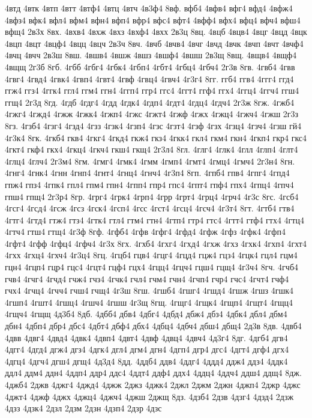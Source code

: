 {4втд
4втк
4втп
4втт
4втф4
4втц
4втч
4в3ф4
8вф.
вфб4
4вфв4
вфг4
вфд4
4вфж4
4вфз4
вфк4
вфл4
вфм4
вфн4
вфп4
вфр4
вфс4
вфт4
4вфф4
вфх4
вфц4
вфч4
вфш4
вфщ4
2в3х
8вх.
4вхв4
4вхж
4вхз
4вхф4
4вхх
2в3ц
8вц.
4вцб
4вцв4
4вцг
4вцд
4вцк
4вцп
4вцт
4вцф4
4вцц
4вцч
2в3ч
8вч.
4вчб
4вчв4
4вчг
4вчд
4вчк
4вчп
4вчт
4вчф4
4вчц
4вчч
2в3ш
8вш.
4вшв4
4вшж
4вшз
4вшф4
4вшш
2в3щ
8вщ.
4вщв4
4вщф4
4вщщ
2г3б
8гб.
4гбб
4гбг4
4гбк4
4гбп4
4гбт4
4гбц4
4гбч4
2г3в
8гв.
4гвб4
4гвв
4гвг4
4гвд4
4гвк4
4гвп4
4гвт4
4гвф
4гвц4
4гвч4
4г3г4
8гг.
ггб4
ггв4
4ггг4
ггд4
ггж4
ггз4
4ггк4
ггл4
ггм4
ггн4
4ггп4
ггр4
ггс4
4ггт4
ггф4
ггх4
4ггц4
4ггч4
ггш4
ггщ4
2г3д
8гд.
4гдб
4гдг4
4гдд
4гдк4
4гдп4
4гдт4
4гдц4
4гдч4
2г3ж
8гж.
4гжб4
4гжг4
4гжд4
4гжж
4гжк4
4гжп4
4гжс
4гжт4
4гжф
4гжх
4гжц4
4гжч4
4гжш
2г3з
8гз.
4гзб4
4гзг4
4гзд4
4гзз
4гзк4
4гзп4
4гзс
4гзт4
4гзф
4гзх
4гзц4
4гзч4
4гзш
гй4
4г3к4
8гк.
4гкб4
гкв4
4гкг4
4гкд4
гкж4
гкз4
4гкк4
гкл4
гкм4
гкн4
4гкп4
гкр4
гкс4
4гкт4
гкф4
гкх4
4гкц4
4гкч4
гкш4
гкщ4
2г3л4
8гл.
4глг4
4глк4
4глл
4глп4
4глт4
4глц4
4глч4
2г3м4
8гм.
4гмг4
4гмк4
4гмм
4гмп4
4гмт4
4гмц4
4гмч4
2г3н4
8гн.
4гнг4
4гнк4
4гнн
4гнп4
4гнт4
4гнц4
4гнч4
4г3п4
8гп.
4гпб4
гпв4
4гпг4
4гпд4
гпж4
гпз4
4гпк4
гпл4
гпм4
гпн4
4гпп4
гпр4
гпс4
4гпт4
гпф4
гпх4
4гпц4
4гпч4
гпш4
гпщ4
2г3р4
8гр.
4грг4
4грк4
4грп4
4грр
4грт4
4грц4
4грч4
4г3с
8гс.
4гсб4
4гсг4
4гсд4
4гсж
4гсз
4гск4
4гсп4
4гсс
4гст4
4гсц4
4гсч4
4г3т4
8гт.
4гтб4
гтв4
4гтг4
4гтд4
гтж4
гтз4
4гтк4
гтл4
гтм4
гтн4
4гтп4
гтр4
гтс4
4гтт4
гтф4
гтх4
4гтц4
4гтч4
гтш4
гтщ4
4г3ф
8гф.
4гфб4
4гфв
4гфг4
4гфд4
4гфж
4гфз
4гфк4
4гфп4
4гфт4
4гфф
4гфц4
4гфч4
4г3х
8гх.
4гхб4
4гхг4
4гхд4
4гхж
4гхз
4гхк4
4гхп4
4гхт4
4гхх
4гхц4
4гхч4
4г3ц4
8гц.
4гцб4
гцв4
4гцг4
4гцд4
гцж4
гцз4
4гцк4
гцл4
гцм4
гцн4
4гцп4
гцр4
гцс4
4гцт4
гцф4
гцх4
4гцц4
4гцч4
гцш4
гцщ4
4г3ч4
8гч.
4гчб4
гчв4
4гчг4
4гчд4
гчж4
гчз4
4гчк4
гчл4
гчм4
гчн4
4гчп4
гчр4
гчс4
4гчт4
гчф4
гчх4
4гчц4
4гчч4
гчш4
гчщ4
4г3ш
8гш.
4гшб4
4гшг4
4гшд4
4гшж
4гшз
4гшк4
4гшп4
4гшт4
4гшц4
4гшч4
4гшш
4г3щ
8гщ.
4гщг4
4гщк4
4гщп4
4гщт4
4гщц4
4гщч4
4гщщ
4д3б4
8дб.
4дбб4
дбв4
4дбг4
4дбд4
дбж4
дбз4
4дбк4
дбл4
дбм4
дбн4
4дбп4
дбр4
дбс4
4дбт4
дбф4
дбх4
4дбц4
4дбч4
дбш4
дбщ4
2д3в
8дв.
4двб4
4двв
4двг4
4двд4
4двк4
4двп4
4двт4
4двф
4двц4
4двч4
4д3г4
8дг.
4дгб4
дгв4
4дгг4
4дгд4
дгж4
дгз4
4дгк4
дгл4
дгм4
дгн4
4дгп4
дгр4
дгс4
4дгт4
дгф4
дгх4
4дгц4
4дгч4
дгш4
дгщ4
4д3д4
8дд.
4ддб4
ддв4
4ддг4
4ддд4
ддж4
ддз4
4ддк4
ддл4
ддм4
ддн4
4ддп4
ддр4
ддс4
4ддт4
ддф4
ддх4
4ддц4
4ддч4
ддш4
ддщ4
8дж.
4джб4
2джв
4джг4
4джд4
4джж
2джз
4джк4
2джл
2джм
2джн
4джп4
2джр
4джс
4джт4
4джф
4джх
4джц4
4джч4
4джш
2джщ
8дз.
4дзб4
2дзв
4дзг4
4дзд4
2дзж
4дзз
4дзк4
2дзл
2дзм
2дзн
4дзп4
2дзр
4дзс
}
